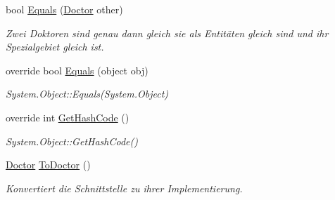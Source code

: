 \begin{CompactItemize}
\item 
bool \hyperlink{classmy_m_d_1_1_model_1_1_data_model_1_1_doctor_824a27e9f956ed471d294272a7428c52}{Equals} (\hyperlink{classmy_m_d_1_1_model_1_1_data_model_1_1_doctor}{Doctor} other)
\begin{CompactList}\small\item\em Zwei Doktoren sind genau dann gleich sie als Entit\"{a}ten gleich sind und ihr Spezialgebiet gleich ist. \item\end{CompactList}\item 
\hypertarget{classmy_m_d_1_1_model_1_1_data_model_1_1_doctor_b93f11cf5ba054f230a537cff58bd1c9}{
override bool \hyperlink{classmy_m_d_1_1_model_1_1_data_model_1_1_doctor_b93f11cf5ba054f230a537cff58bd1c9}{Equals} (object obj)}
\label{db/d24/classmy_m_d_1_1_model_1_1_data_model_1_1_doctor_b93f11cf5ba054f230a537cff58bd1c9}

\begin{CompactList}\small\item\em System.Object::Equals(System.Object) \item\end{CompactList}\item 
\hypertarget{classmy_m_d_1_1_model_1_1_data_model_1_1_doctor_871aff832c00675bb79db4294f382e58}{
override int \hyperlink{classmy_m_d_1_1_model_1_1_data_model_1_1_doctor_871aff832c00675bb79db4294f382e58}{Get\-Hash\-Code} ()}
\label{db/d24/classmy_m_d_1_1_model_1_1_data_model_1_1_doctor_871aff832c00675bb79db4294f382e58}

\begin{CompactList}\small\item\em System.Object::Get\-Hash\-Code() \item\end{CompactList}\item 
\hyperlink{classmy_m_d_1_1_model_1_1_data_model_1_1_doctor}{Doctor} \hyperlink{classmy_m_d_1_1_model_1_1_data_model_1_1_doctor_603e176dcbd8ab965588d1e0cb671f64}{To\-Doctor} ()
\begin{CompactList}\small\item\em Konvertiert die Schnittstelle zu ihrer Implementierung. \item\end{CompactList}\end{CompactItemize}
